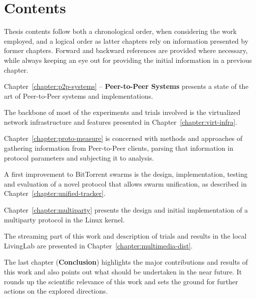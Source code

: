 \section{Contents}
\label{sec:intro:contents}

Thesis contents follow both a chronological order, when considering the work
employed, and a logical order as latter chapters rely on information presented
by former chapters. Forward and backward references are provided where
necessary, while always keeping an eye out for providing the initial
information in a previous chapter.

Chapter~\ref{chapter:p2p-systems} -- \textbf{Peer-to-Peer Systems} presents a
state of the art of Peer-to-Peer systems and implementations.

The backbone of most of the experiments and trials involved is the
virtualized network infrastructure and features presented in
Chapter~\ref{chapter:virt-infra}.

Chapter~\ref{chapter:proto-measure} is concerned with methods and approaches
of gathering information from Peer-to-Peer clients, parsing that information
in protocol parameters and subjecting it to analysis.

A first improvement to BitTorrent swarms is the design, implementation,
testing and evaluation of a novel protocol that allows swarm unification, as
described in Chapter~\ref{chapter:unified-tracker}.

Chapter~\ref{chapter:multiparty} presents the design and initial
implementation of a multiparty protocol in the Linux kernel.

The streaming part of this work and description of trials and results in the
local LivingLab are presented in Chapter~\ref{chapter:multimedia-dist}.

The last chapter (\textbf{Conclusion}) highlights the major contributions and
results of this work and also points out what should be undertaken in the near
future. It rounds up the scientific relevance of this work and sets the ground
for further actions on the explored directions.
